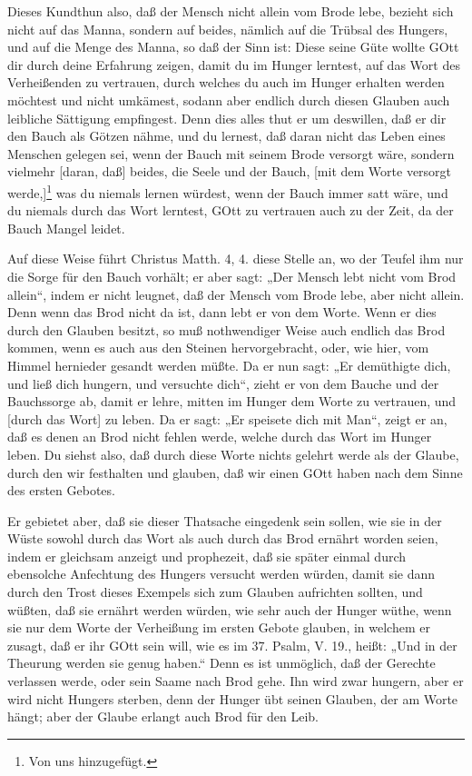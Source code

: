 Dieses Kundthun also, daß der Mensch nicht allein vom Brode lebe, bezieht sich nicht auf das Manna, sondern auf beides, nämlich auf die Trübsal des Hungers, und auf die Menge des Manna, so daß der Sinn ist: Diese seine Güte wollte GOtt dir durch deine Erfahrung zeigen, damit du im Hunger lerntest, auf das Wort des Verheißenden zu vertrauen, durch welches du auch im Hunger erhalten werden möchtest und nicht umkämest, sodann aber endlich durch diesen Glauben auch leibliche Sättigung empfingest. Denn dies alles thut er um deswillen, daß er dir den Bauch als Götzen nähme, und du lernest, daß daran nicht das Leben eines Menschen gelegen sei, wenn der Bauch mit seinem Brode versorgt wäre, sondern vielmehr [daran, daß] beides, die Seele und der Bauch, [mit dem Worte versorgt werde,]\footnote{Von uns hinzugefügt.} was du niemals lernen würdest, wenn der Bauch immer satt wäre, und du niemals durch das Wort lerntest, GOtt zu vertrauen auch zu der Zeit, da der Bauch Mangel leidet.

Auf diese Weise führt Christus Matth. 4, 4. diese Stelle an, wo der Teufel ihm nur die Sorge für den Bauch vorhält; er aber sagt: „Der Mensch lebt nicht vom Brod allein“, indem er nicht leugnet, daß der Mensch vom Brode lebe, aber nicht allein. Denn wenn das Brod nicht da ist, dann lebt er von dem Worte. Wenn er dies durch den Glauben besitzt, so muß nothwendiger Weise auch endlich das Brod kommen, wenn es auch aus den Steinen hervorgebracht, oder, wie hier, vom Himmel hernieder gesandt werden müßte. Da er nun sagt: „Er demüthigte dich, und ließ dich hungern, und versuchte dich“, zieht er von dem Bauche und der Bauchssorge ab, damit er lehre, mitten im Hunger dem Worte zu vertrauen, und [durch das Wort] zu leben. Da er sagt: „Er speisete dich mit Man“, zeigt er an, daß es denen an Brod nicht fehlen werde, welche durch das Wort im Hunger leben. Du siehst also, daß durch diese Worte nichts gelehrt werde als der Glaube, durch den wir festhalten und glauben, daß wir einen GOtt haben nach dem Sinne des ersten Gebotes.

Er gebietet aber, daß sie dieser Thatsache eingedenk sein sollen, wie sie in der Wüste sowohl durch das Wort als auch durch das Brod ernährt worden seien, indem er gleichsam anzeigt und prophezeit, daß sie später einmal durch ebensolche Anfechtung des Hungers versucht werden würden, damit sie dann durch den Trost dieses Exempels sich zum Glauben aufrichten sollten, und wüßten, daß sie ernährt werden würden, wie sehr auch der Hunger wüthe, wenn sie nur dem Worte der Verheißung im ersten Gebote glauben, in welchem er zusagt, daß er ihr GOtt sein will, wie es im 37. Psalm, V. 19., heißt: „Und in der Theurung werden sie genug haben.“ Denn es ist unmöglich, daß der Gerechte verlassen werde, oder sein Saame nach Brod gehe. Ihn wird zwar hungern, aber er wird nicht Hungers sterben, denn der Hunger übt seinen Glauben, der am Worte hängt; aber der Glaube erlangt auch Brod für den Leib.

